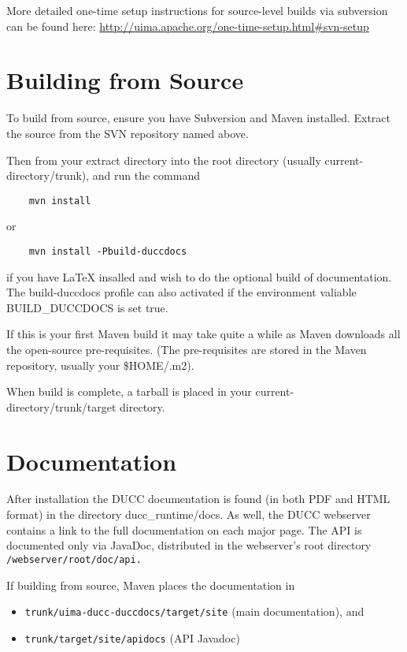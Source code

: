 More detailed one-time setup instructions for source-level builds via subversion can be found here:
\url{http://uima.apache.org/one-time-setup.html#svn-setup}

\section{Building from Source}

To build from source, ensure you have
Subversion and Maven installed.  Extract the source from the SVN repository named above. 

Then from your extract directory into
the root directory (usually current-directory/trunk), and run the command
\begin{verbatim}
    mvn install
\end{verbatim}
or
\begin{verbatim}
    mvn install -Pbuild-duccdocs
\end{verbatim}
if you have LaTeX insalled and wish to do the optional build of documentation.
The build-duccdocs profile can also activated if the environment valiable BUILD\_DUCCDOCS is set true.

If this is your first Maven build it may take quite a while as Maven downloads all the
open-source pre-requisites.  (The pre-requisites are stored in the Maven repository, usually
your \$HOME/.m2).

When build is complete, a tarball is placed in your current-directory/trunk/target
directory.

\section{Documentation}
\begin{sloppypar}
After installation the DUCC documentation is found (in both PDF and HTML format) in the directory 
ducc\_runtime/docs.  As well, the DUCC webserver contains a link to the full documentation on each major page.
The API is documented only via JavaDoc, distributed in the webserver's root directory 
{\tt \duccruntime/webserver/root/doc/api.}  
\end{sloppypar}

If building from source, Maven places the documentation in
\begin{itemize}
    \item {\tt trunk/uima-ducc-duccdocs/target/site} (main documentation), and 
    \item {\tt trunk/target/site/apidocs} (API Javadoc)
\end{itemize}

